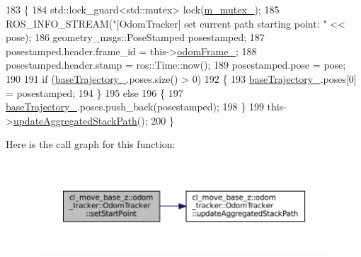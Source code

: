 \begin{DoxyCode}
183         \{
184             std::lock\_guard<std::mutex> lock(\hyperlink{classcl__move__base__z_1_1odom__tracker_1_1OdomTracker_aa371639e1eee269273dec8d3ab9dba0f}{m\_mutex\_});
185             ROS\_INFO\_STREAM(\textcolor{stringliteral}{"[OdomTracker] set current path starting point: "} << pose);
186             geometry\_msgs::PoseStamped posestamped;
187             posestamped.header.frame\_id = this->\hyperlink{classcl__move__base__z_1_1odom__tracker_1_1OdomTracker_a54f31af5e74006560d94f266297853d4}{odomFrame\_};
188             posestamped.header.stamp = ros::Time::now();
189             posestamped.pose = pose;
190 
191             \textcolor{keywordflow}{if} (\hyperlink{classcl__move__base__z_1_1odom__tracker_1_1OdomTracker_a466d18a86df049f0f680e043bb5ea91f}{baseTrajectory\_}.poses.size() > 0)
192             \{
193                 \hyperlink{classcl__move__base__z_1_1odom__tracker_1_1OdomTracker_a466d18a86df049f0f680e043bb5ea91f}{baseTrajectory\_}.poses[0] = posestamped;
194             \}
195             \textcolor{keywordflow}{else}
196             \{
197                 \hyperlink{classcl__move__base__z_1_1odom__tracker_1_1OdomTracker_a466d18a86df049f0f680e043bb5ea91f}{baseTrajectory\_}.poses.push\_back(posestamped);
198             \}
199             this->\hyperlink{classcl__move__base__z_1_1odom__tracker_1_1OdomTracker_a7922f1e1e688a2ed62d32d9914985a9f}{updateAggregatedStackPath}();
200         \}
\end{DoxyCode}
Here is the call graph for this function\+:
\nopagebreak
\begin{figure}[H]
\begin{center}
\leavevmode
\includegraphics[width=350pt]{classcl__move__base__z_1_1odom__tracker_1_1OdomTracker_a4aefe72c155bd0d57c9f42b77a8928a6_cgraph}
\end{center}
\end{figure}
\mbox{\label{classcl__move__base__z_1_1odom__tracker_1_1OdomTracker_aeed01bdefd9a1cc709b0b3e4eed285ed}} 
